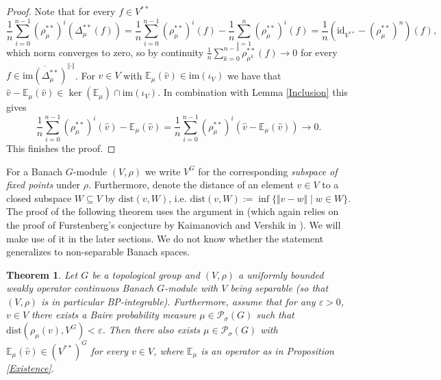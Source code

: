 \documentclass[a4paper,11pt,reqno]{amsart}
\numberwithin{equation}{section}
\newtheorem{theorem}{Theorem}[section]
\theoremstyle{definition}
\theoremstyle{remark}
\theoremstyle{remark}
\begin{document}
\begin{proof} Note that for every $f\in V^{\ast\ast}$ 
\[
\frac{1}{n}\sum_{i=0}^{n-1}(\rho_{\mu}^{\ast\ast})^{i}\left(\Delta_{\mu}^{\ast\ast}(f)\right)=\frac{1}{n}\sum_{i=0}^{n-1}(\rho_{\mu}^{\ast\ast})^{i}(f)-\frac{1}{n}\sum_{i=1}^{n}(\rho_{\mu}^{\ast\ast})^{i}(f)=\frac{1}{n}(\text{id}_{V^{\ast\ast}}-(\rho_{\mu}^{\ast\ast})^{n})(f),
\]
which norm converges to zero, so by continuity $\frac{1}{n}\sum_{k=0}^{n-1}\rho_{\mu^{k}}^{\ast\ast}(f)\rightarrow0$ for every $f\in\overline{\text{im}(\Delta_{\mu}^{\ast\ast})}^{\Vert\cdot\Vert}$. For $v\in V$ with $\mathbb{E}_{\mu}(\widehat{v})\in\text{im}(\iota_{V})$ we have that $\widehat{v}-\mathbb{E}_{\mu}(\widehat{v})\in\ker(\mathbb{E}_{\mu})\cap\text{im}(\iota_{V})$. In combination with Lemma \ref{Inclusion} this gives 
\[
\frac{1}{n}\sum_{i=0}^{n-1}(\rho_{\mu}^{\ast\ast})^{i}(\widehat{v})-\mathbb{E}_{\mu}(\widehat{v})=\frac{1}{n}\sum_{i=0}^{n-1}(\rho_{\mu}^{\ast\ast})^{i}(\widehat{v}-\mathbb{E}_{\mu}(\widehat{v}))\rightarrow0.
\]
This finishes the proof. \end{proof}

For a Banach $G$-module $(V,\rho)$ we write $V^{G}$ for the corresponding \emph{subspace of fixed points} under $\rho$. Furthermore, denote the distance of an element $v\in V$ to a closed subspace $W\subseteq V$ by $\text{dist}(v,W)$, i.e. $\text{dist}(v,W):=\inf\{\Vert v-w\Vert\mid w\in W\}$. \\

The proof of the following theorem uses the argument in \cite[Theorem 5.1]{HartmanKalantar} (which again relies on the proof of Furstenberg's conjecture by Kaimanovich and Vershik in \cite[Theorem 4.3]{KaimanovichVershik}). We will make use of it in the later sections. We do not know whether the statement generalizes to non-separable Banach spaces.

\begin{theorem} \label{FixedPointApproximation} Let $G$ be a topological group and $(V,\rho)$ a uniformly bounded weakly operator continuous Banach $G$-module with $V$ being separable (so that $(V,\rho)$ is in particular BP-integrable). Furthermore, assume that for any $\varepsilon>0$, $v\in V$ there exists a Baire probability measure $\mu\in\mathcal{P}_{\sigma}(G)$ such that \emph{$\text{dist}\left(\rho_{\mu}(v),V^{G}\right)<\varepsilon$}. Then there also exists $\mu\in\mathcal{P}_{\sigma}(G)$ with $\mathbb{E}_{\mu}(\widehat{v})\in(V^{\ast\ast})^{G}$ for every $v\in V$, where $\mathbb{E}_{\mu}$ is an operator as in Proposition \ref{Existence}. \end{theorem}
\end{document}
